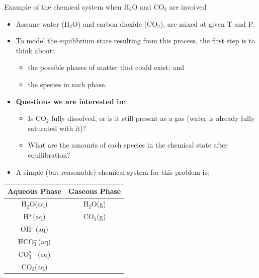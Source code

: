 %
\begin{frame}{Example of the chemical system when H$_{2}$O and CO$_{2}$ are involved}

\lcol
\begin{itemize}
\item Assume water (H$_{2}$O) and carbon dioxide (CO$_{2}$), are mixed
at given T and P. 
\pause
\item To model the equilibrium state resulting from this process, the first
step is to think about:
\begin{itemize}
\item the possible phases of matter that could exist; and
\item the species in each phase. 
\end{itemize}
%
\pause
\item \alert{\textbf{Questions we are interested in}}: 
\begin{itemize}
\item Is CO$_{2}$ fully dissolved, or is it still present as a gas (water is already fully saturated with it)?
\item What are the amounts of each species in the chemical state after equilibration?
\end{itemize}
\end{itemize}
\rcol
\begin{itemize}
\item A simple (but reasonable) chemical system for this problem is:
\end{itemize}
\begin{center}
\begin{tabular}{cc}
\toprule 
\textbf{Aqueous Phase} & \textbf{Gaseous Phase}\tabularnewline
\midrule
H$_{2}$O(aq) & H$_{2}$O(g)\tabularnewline
H$^{+}$(aq) & CO$_{2}$(g)\tabularnewline
OH$^{-}$(aq) & \tabularnewline
HCO$_{3}^{-}$(aq) & \tabularnewline
CO$_{3}^{2-}$(aq) & \tabularnewline
CO$_{2}$(aq) & \tabularnewline
\bottomrule
\end{tabular}
\par\end{center}

\ecol
\end{frame}
%
